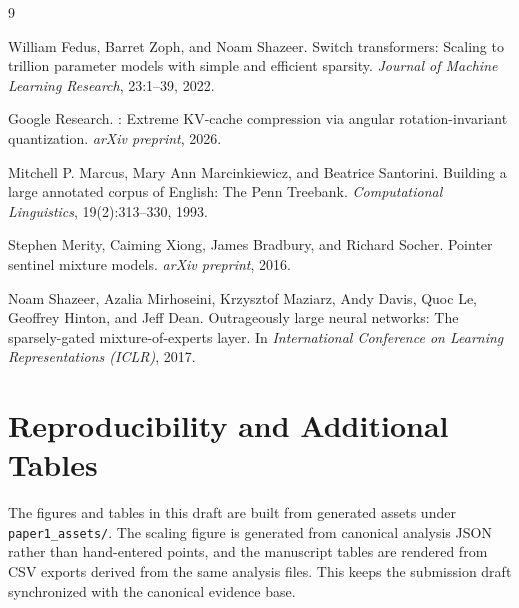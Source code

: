 \documentclass[10pt,twocolumn]{article}
\begin{document}
\begin{thebibliography}{9}

William Fedus, Barret Zoph, and Noam Shazeer.
\newblock Switch transformers: Scaling to trillion parameter models with simple and efficient sparsity.
\newblock \emph{Journal of Machine Learning Research}, 23:1--39, 2022.

Google Research.
: Extreme {KV}-cache compression via angular rotation-invariant quantization.
\newblock \emph{arXiv preprint}, 2026.

Mitchell P. Marcus, Mary Ann Marcinkiewicz, and Beatrice Santorini.
\newblock Building a large annotated corpus of English: The {Penn Treebank}.
\newblock \emph{Computational Linguistics}, 19(2):313--330, 1993.

Stephen Merity, Caiming Xiong, James Bradbury, and Richard Socher.
\newblock Pointer sentinel mixture models.
\newblock \emph{arXiv preprint}, 2016.

Noam Shazeer, Azalia Mirhoseini, Krzysztof Maziarz, Andy Davis, Quoc Le, Geoffrey Hinton, and Jeff Dean.
\newblock Outrageously large neural networks: The sparsely-gated mixture-of-experts layer.
\newblock In \emph{International Conference on Learning Representations (ICLR)}, 2017.

\end{thebibliography}

\appendix
\section{Reproducibility and Additional Tables}
The figures and tables in this draft are built from generated assets under \texttt{paper1\_assets/}. The scaling figure is generated from canonical analysis JSON rather than hand-entered points, and the manuscript tables are rendered from CSV exports derived from the same analysis files. This keeps the submission draft synchronized with the canonical evidence base.

\begin{table}[t]
  \centering
  \caption{PTB detail table exported from canonical analysis results.}
  \small
  
\end{table}
\end{document}
